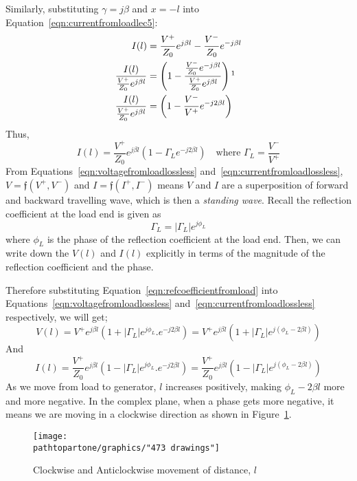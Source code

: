Similarly, substituting $\gamma = j\beta$ and $x = -l$ into Equation~\eqref{eqn:currentfromloadlec5}:
\begin{align*}
I(l) &= \frac{V^+}{Z_0} e^{j \beta l} - \frac{V^-}{Z_0} e^{-j\beta l}\\
\frac{I(l)}{\frac{V^+}{Z_0} e^{j\beta l}} &= \left( 1- \frac{\frac{V^-}{Z_0} e^{-j\beta l}}{\frac{V^+}{Z_0} e^{j\beta l}}\right)\footnotemark\\
\frac{I(l)}{\frac{V^+}{Z_0} e^{j\beta l}} &= \left(1- \frac{V^-}{V^+}e^{-j 2 \beta l}\right)
\end{align*}
Thus,
\begin{equation}
I(l) = \frac{V^+}{Z_0}e ^{j \beta l} \left( 1 - \Gamma_L e^{-j 2 \beta l}\right)\quad\text{where }\Gamma _L = \frac{V^-}{V^+}
\label{eqn:currentfromloadlossless}
\end{equation}
From Equations~\eqref{eqn:voltagefromloadlossless} and~\eqref{eqn:currentfromloadlossless}, $V = \mathfrak{f}( V^{+}, V^{-})$ and $I = \mathfrak{f}(I^{+}, I^{-})$ means $V$ and $I$ are a superposition of forward and backward travelling wave, which is then a \emph{standing wave}. Recall the reflection coefficient at the load end is given as
\begin{equation}
\Gamma_L = |\Gamma_L|e^{j\phi_L}
\label{eqn:refcoefficientfromload}
\end{equation}
where $\phi_L$ is the phase of the reflection coefficient at the load end. Then, we can write down the $V(l)$ and $I(l)$ explicitly in terms of the magnitude of the reflection coefficient and the phase.

Therefore substituting Equation~\eqref{eqn:refcoefficientfromload} into Equations~\eqref{eqn:voltagefromloadlossless} and~\eqref{eqn:currentfromloadlossless} respectively, we will get;
\begin{dmath}
V(l) = V^{+}e^{j\beta l}(1 + |\Gamma_L|e^{j\phi_L} . e^{-j 2 \beta l})
= V^{+}e^{j\beta l}(1 + |\Gamma_L| e^{j(\phi_L -2 \beta l)})
\end{dmath}
And
\begin{dmath}
I(l) = \frac{V^+}{Z_0}e ^{j \beta l}( 1 - |\Gamma_L|e^{j\phi_L} . e^{-j 2\beta l})
= \frac{V^+}{Z_0}e ^{j \beta l}( 1 -|\Gamma_L| e^{j(\phi_L -2 \beta l)})
\end{dmath}
As we move from load to generator, $l$ increases positively, making $\phi_L -2\beta l$ more and more negative. In the complex plane, when a phase gets more negative, it means we are moving in a clockwise direction as shown in Figure~\ref{fig:473-drawings}.
\begin{figure}[h]
\centering
\texttt{[image: \\pathtopartone/graphics/"473 drawings"]}
\caption{Clockwise and Anticlockwise movement of distance, $l$}
\label{fig:473-drawings}
\end{figure}

